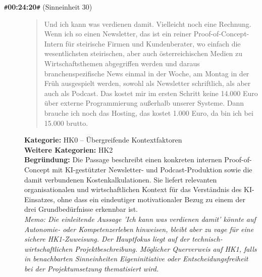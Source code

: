 \begin{description}
  \item[\texttt{\#}\textbf{00:24:20}\texttt{\#} (Sinneinheit 30)]
  \begin{quote}
  Und ich kann was verdienen damit. Vielleicht noch eine Rechnung. Wenn ich so einen Newsletter, das ist ein reiner Proof-of-Concept-Intern für steirische Firmen und Kundenberater, wo einfach die wesentlichsten steirischen, aber auch österreichischen Medien zu Wirtschaftsthemen abgegriffen werden und daraus branchenspezifische News einmal in der Woche, am Montag in der Früh ausgespielt werden, sowohl als Newsletter schriftlich, als aber auch als Podcast. Das kostet mir im ersten Schritt keine 14.000 Euro über externe Programmierung außerhalb unserer Systeme. Dann brauche ich noch das Hosting, das kostet 1.000 Euro, da bin ich bei 15.000 brutto.
  \end{quote}
  \textbf{Kategorie:} HK0 -- Übergreifende Kontextfaktoren\\
  \textbf{Weitere Kategorien:} HK2\\
  \textbf{Begr\"undung:} Die Passage beschreibt einen konkreten internen Proof-of-Concept mit KI-gestützter Newsletter- und Podcast-Produktion sowie die damit verbundenen Kostenkalkulationen. Sie liefert relevanten organisationalen und wirtschaftlichen Kontext für das Verständnis des KI-Einsatzes, ohne dass ein eindeutiger motivationaler Bezug zu einem der drei Grundbedürfnisse erkennbar ist.
  \\\textit{Memo: Die einleitende Aussage 'Ich kann was verdienen damit' könnte auf Autonomie- oder Kompetenzerleben hinweisen, bleibt aber zu vage für eine sichere HK1-Zuweisung. Der Hauptfokus liegt auf der technisch-wirtschaftlichen Projektbeschreibung. Möglicher Querverweis auf HK1, falls in benachbarten Sinneinheiten Eigeninitiative oder Entscheidungsfreiheit bei der Projektumsetzung thematisiert wird.}
\end{description}
\medskip

